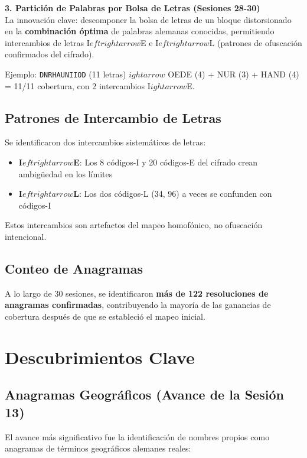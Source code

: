 \documentclass[11pt,a4paper]{article}
\begin{document}
\textbf{3. Partici\'{o}n de Palabras por Bolsa de Letras (Sesiones 28-30)}\\
La innovaci\'{o}n clave: descomponer la bolsa de letras de un bloque distorsionado en la \textbf{combinaci\'{o}n \'{o}ptima} de palabras alemanas conocidas, permitiendo intercambios de letras I$eftrightarrow$E e I$eftrightarrow$L (patrones de ofuscaci\'{o}n confirmados del cifrado).

Ejemplo: \texttt{DNRHAUNIIOD} (11 letras) $
ightarrow$ OEDE (4) + NUR (3) + HAND (4) = 11/11 cobertura, con 2 intercambios I$
ightarrow$E.

\subsection{Patrones de Intercambio de Letras}

Se identificaron dos intercambios sistem\'{a}ticos de letras:

\begin{itemize}
\item \textbf{I$eftrightarrow$E}: Los 8 c\'{o}digos-I y 20 c\'{o}digos-E del cifrado crean ambig\"{u}edad en los l\'{i}mites
\item \textbf{I$eftrightarrow$L}: Los dos c\'{o}digos-L (34, 96) a veces se confunden con c\'{o}digos-I
\end{itemize}

Estos intercambios son artefactos del mapeo homof\'{o}nico, no ofuscaci\'{o}n intencional.

\subsection{Conteo de Anagramas}

A lo largo de 30 sesiones, se identificaron \textbf{m\'{a}s de 122 resoluciones de anagramas confirmadas}, contribuyendo la mayor\'{i}a de las ganancias de cobertura despu\'{e}s de que se estableci\'{o} el mapeo inicial.

\section{Descubrimientos Clave}

\subsection{Anagramas Geogr\'{a}ficos (Avance de la Sesi\'{o}n 13)}

El avance m\'{a}s significativo fue la identificaci\'{o}n de nombres propios como anagramas de t\'{e}rminos geogr\'{a}ficos alemanes reales:
\end{document}
